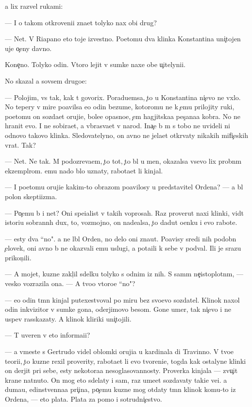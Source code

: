 \documentclass[10pt]{book}
\begin{document}
{\Y}a lix razvel rukami:

— I o takom otkroveni{\y}i zna{\y}et tolyko nax ob{\x}i{\y} drug?

— Net. V Riapano eto toje izvestno. Poetomu dva klinka Konstantina uni{\c}tojen{\yi} uje o{\c}eny davno.

Kone{\c}no. Tolyko odin. Vtoro{\y} lejit v sumke naxe{\y} ob{\x}e{\y} u{\c}itelyni{\q}i.

No skazal {\y}a sovsem drugo{\y}e:

— Polojim, vs{\e} tak, kak t{\yi} govorix. Poradu{\y}emsa, {\c}to u Konstantina ni{\c}evo ne v{\yi}xlo. No tepery v mire po{\y}avilsa {\y}e{\x}o odin bezume{\q}, kotoromu ne k {\c}emu prilojity ruki, poetomu on sozda{\y}et oruji{\y}e, bole{\y}e opasno{\y}e, {\c}em hagjitska{\y}a pes{\c}ana{\y}a kobra. No ne hranit {\y}evo. I ne sobira{\y}et, a v{\yi}bras{\yi}va{\y}et v narod. Ina{\c}e b{\yi} m{\yi} s tobo{\y} ne uvideli ni odnovo takovo klinka. Sledovatelyno, on {\y}avno ne jela{\y}et otkr{\yi}vaty nikakih mifi{\c}eskih vrat. Tak?

— Net. Ne tak. M{\yi} podozreva{\y}em, {\c}to tot, {\c}to b{\yi}l u men{\ia}, okazalsa vsevo lix probn{\yi}m ekzempl{\ia}rom. {\Y}emu nado b{\yi}lo uznaty, rabota{\y}et li kinjal.

— I poetomu oruji{\y}e kakim-to obrazom po{\y}avilosy u predstavitel{\ia} Ordena? — {\Y}a b{\yi}l polon skepti{\q}izma.

— Po{\c}emu b{\yi} i net? Oni spe{\q}ialist{\yi} v takih voprosah. Raz prover{\ia}{\y}ut naxi klinki, vid{\ia}t istori{\y}u sobrann{\yi}h dux, to, vozmojno, on nade{\y}alsa, {\c}to dadut o{\q}enku i {\y}evo rabote.

— {\Y}esty dva ``no". {\Y}a ne l{\iu}bl{\iu} Orden, no delo oni zna{\y}ut. Po{\y}avisy sredi nih podobn{\yi}{\y} {\c}elovek, oni {\y}avno b{\yi} ne okaz{\yi}vali {\y}emu uslugi, a pota{\x}ili k sebe v podval{\yi}. Ili je srazu prikon{\c}ili.

— A mojet, kuzne{\q} zakl{\iu}{\c}il sdelku tolyko s odnim iz nih. S sam{\yi}m ne{\c}istoplotn{\yi}m, — vesko vozrazila ona. — A tvo{\y}o vtoro{\y}e ``no"?

— {\y}e{\x}o odin t{\e}mn{\yi}{\y} kinjal putexestvoval po miru bez svo{\y}evo sozdatel{\ia}. Klinok naxol odin inkvizitor v sumke gon{\q}a, oderjimovo besom. Gone{\q} umer, tak ni{\c}evo i ne uspev rasskazaty. A klinok kliriki uni{\c}tojili.

— T{\yi} uveren v eto{\y} informa{\q}i{\y}i?

— {\Y}a vmeste s Gertrudo{\y} videl oblomki oruji{\y}a u kardinala di Travinno. V tvo{\y}e{\y} teori{\y}i, {\c}to kuzne{\q} rexil proverity, rabota{\y}et li {\y}evo tvoreni{\y}e, togda kak ostalyn{\yi}{\y}e klinki on derjit pri sebe, {\y}esty nekotora{\y}a nesoglasovannosty. Proverka kinjala — zvu{\c}it kra{\y}ne nat{\ia}nuto. On mog eto sdelaty i sam, raz ume{\y}et sozdavaty taki{\y}e ve{\x}i. {\Y}a duma{\y}u, {\y}edinstvenna{\y}a pri{\c}ina, po{\c}emu kuzne{\q} mog otdaty t{\e}mn{\yi}{\y} klinok komu-to iz Ordena, — eto plata. Plata za pomo{\x} i sotrudni{\c}estvo.
\end{document}

